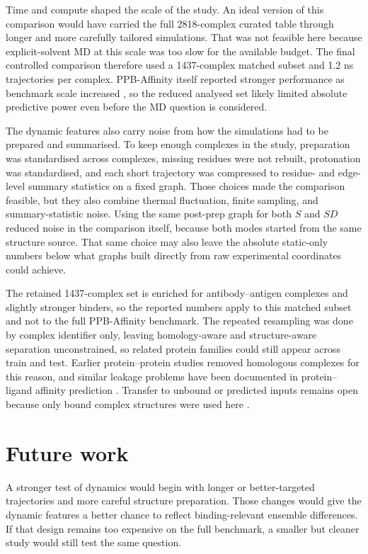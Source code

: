 Time and compute shaped the scale of the study. An ideal version of this comparison would have carried the full 2818-complex curated table through longer and more carefully tailored simulations. That was not feasible here because explicit-solvent MD at this scale was too slow for the available budget. The final controlled comparison therefore used a 1437-complex matched subset and 1.2 ns trajectories per complex. PPB-Affinity itself reported stronger performance as benchmark scale increased \citep{Liu2024PPBAffinity}, so the reduced analysed set likely limited absolute predictive power even before the MD question is considered.

The dynamic features also carry noise from how the simulations had to be prepared and summarised. To keep enough complexes in the study, preparation was standardised across complexes, missing residues were not rebuilt, protonation was standardised, and each short trajectory was compressed to residue- and edge-level summary statistics on a fixed graph. Those choices made the comparison feasible, but they also combine thermal fluctuation, finite sampling, and summary-statistic noise. Using the same post-prep graph for both $S$ and $SD$ reduced noise in the comparison itself, because both modes started from the same structure source. That same choice may also leave the absolute static-only numbers below what graphs built directly from raw experimental coordinates could achieve.

The retained 1437-complex set is enriched for antibody--antigen complexes and slightly stronger binders, so the reported numbers apply to this matched subset and not to the full PPB-Affinity benchmark. The repeated resampling was done by complex identifier only, leaving homology-aware and structure-aware separation unconstrained, so related protein families could still appear across train and test. Earlier protein--protein studies removed homologous complexes for this reason, and similar leakage problems have been documented in protein--ligand affinity prediction \citep{Moal2011AffinityPrediction,Graber2025DataBias}. Transfer to unbound or predicted inputs remains open because only bound complex structures were used here \citep{Guo2022PPBAReview}.

\section{Future work}

A stronger test of dynamics would begin with longer or better-targeted trajectories and more careful structure preparation. Those changes would give the dynamic features a better chance to reflect binding-relevant ensemble differences. If that design remains too expensive on the full benchmark, a smaller but cleaner study would still test the same question.

